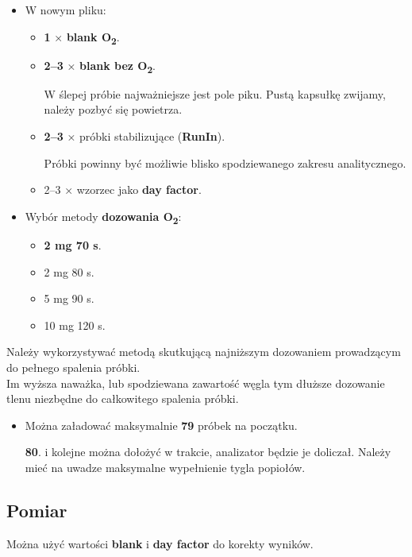 \documentclass[
  letterpaper,
  DIV=11,
  numbers=noendperiod]{scrreprt}
\begin{document}
\begin{itemize}
\item
  W nowym pliku:

  \begin{itemize}
  \item
    \textbf{1} × \textbf{blank O\textsubscript{2}}.
  \item
    \textbf{2--3} × \textbf{blank bez O\textsubscript{2}}.

    W ślepej próbie najważniejsze jest pole piku. Pustą kapsułkę
    zwijamy, należy pozbyć się powietrza.
  \item
    \textbf{2--3} × próbki stabilizujące (\textbf{RunIn}).

    Próbki powinny być możliwie blisko spodziewanego zakresu
    analitycznego.
  \item
    2--3 × wzorzec jako \textbf{day factor}.
  \end{itemize}
\item
  Wybór metody \textbf{dozowania O\textsubscript{2}}:

  \begin{itemize}
  \item
    \textbf{2 mg 70 s}.
  \item
    2 mg 80 s.
  \item
    5 mg 90 s.
  \item
    10 mg 120 s.
  \end{itemize}
\end{itemize}

Należy wykorzystywać metodą skutkującą najniższym dozowaniem prowadzącym
do pełnego spalenia próbki.\\
Im wyższa naważka, lub spodziewana zawartość węgla tym dłuższe dozowanie
tlenu niezbędne do całkowitego spalenia próbki.

\begin{itemize}
\item
  Można załadować maksymalnie \textbf{79} próbek na początku.

  \textbf{80}. i kolejne można dołożyć w trakcie, analizator będzie je
  doliczał. Należy mieć na uwadze maksymalne wypełnienie tygla popiołów.
\end{itemize}

\hypertarget{pomiar}{%
\subsection{Pomiar}\label{pomiar}}

Można użyć wartości \textbf{blank} i \textbf{day factor} do korekty
wyników.
\end{document}
